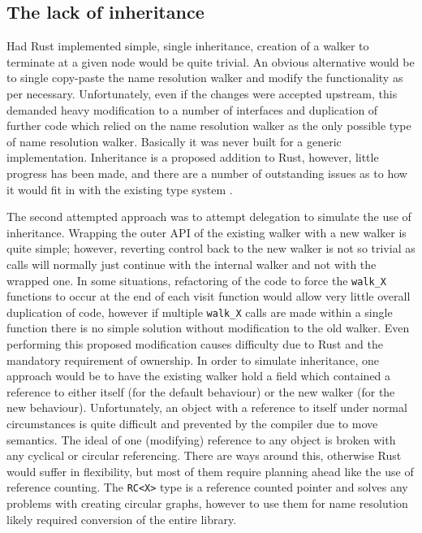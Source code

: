 \subsection{The lack of inheritance}
Had Rust implemented simple, single inheritance, creation of a walker to terminate at a given node would be quite trivial. An obvious alternative would be to single copy-paste the name resolution walker and modify the functionality as per necessary. Unfortunately, even if the changes were accepted upstream, this demanded heavy modification to a number of interfaces and duplication of further code which relied on the name resolution walker as the only possible type of name resolution walker. Basically it was never built for a generic implementation. Inheritance is a proposed addition to Rust, however, little progress has been made, and there are a number of outstanding issues as to how it would fit in with the existing type system \cite{inherit}.

The second attempted approach was to attempt delegation to simulate the use of inheritance. Wrapping the outer API of the existing walker with a new walker is quite simple; however, reverting control back to the new walker is not so trivial as calls will normally just continue with the internal walker and not with the wrapped one. In some situations, refactoring of the code to force the {\verb|walk_X|} functions to occur at the end of each visit function would allow very little overall duplication of code, however if multiple {\verb|walk_X|} calls are made within a single function there is no simple solution without modification to the old walker. Even performing this proposed modification causes difficulty due to Rust and the mandatory requirement of ownership. In order to simulate inheritance, one approach would be to have the existing walker hold a field which contained a reference to either itself (for the default behaviour) or the new walker (for the new behaviour). Unfortunately, an object with a reference to itself under normal circumstances is quite difficult and prevented by the compiler due to move semantics. The ideal of one (modifying) reference to any object is broken with any cyclical or circular referencing. There are ways around this, otherwise Rust would suffer in flexibility, but most of them require planning ahead like the use of reference counting. The {\verb|RC<X>|} type is a reference counted pointer and solves any problems with creating circular graphs, however to use them for name resolution likely required conversion of the entire library.

